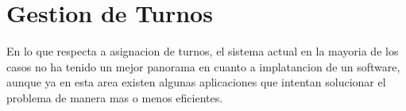 \section{Gestion de Turnos}   

En lo que respecta a asignacion de turnos, el sistema actual en la mayoria de
los casos no ha tenido un mejor panorama en cuanto a implatancion de un software,
aunque ya en esta area existen algunas aplicaciones que intentan solucionar el
problema de manera mas o menos eficientes.\\[0.1cm]
























